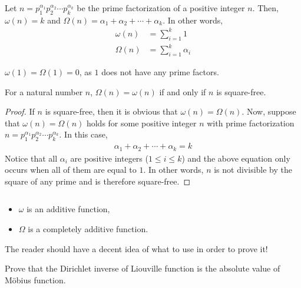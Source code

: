	\begin{proposition}
		Let $n= p_1^{\alpha_1} p_2^{\alpha_2} \cdots p_k^{\alpha_k}$ be the prime factorization of a positive integer $n$. Then, $\omega(n)=k$ and $\Omega(n)=\alpha_1 + \alpha_2 + \cdots + \alpha_k$. In other words,
			\begin{align*}
				\omega(n) & = \sum_{i=1}^{k} 1\\
				\Omega(n) & = \sum_{i=1}^{k} \alpha_i
			\end{align*}
	\end{proposition}

	\begin{note}
		$\omega(1) = \Omega(1)=0$, as $1$ does not have any prime factors.
	\end{note}

	\begin{proposition}
		For a natural number $n$, $\Omega(n)=\omega(n)$ if and only if $n$ is square-free.
	\end{proposition}

	\begin{proof}
		If $n$ is square-free, then it is obvious that $\omega(n)=\Omega(n)$. Now, suppose that $\omega(n)=\Omega(n)$ holds for some positive integer $n$ with prime factorization $n= p_1^{\alpha_1} p_2^{\alpha_2} \cdots p_k^{\alpha_k}$. In this case,
			\begin{align*}
				\alpha_1 + \alpha_2 + \cdots + \alpha_k = k
			\end{align*}
		Notice that all $\alpha_i$ are positive integers ($1 \leq i \leq k$) and the above equation only occurs when all of them are equal to $1$. In other words, $n$ is not divisible by the square of any prime and is therefore square-free.
	\end{proof}

	\begin{proposition}\label{prop:additiveomega}
		$ $
		\begin{itemize}
			\item $\omega$ is an additive function,
			\item $\Omega$ is a completely additive function.
		\end{itemize}
	\end{proposition}
The reader should have a decent idea of what to use in order to prove it!
	\begin{theorem}
		Prove that the Dirichlet inverse of Liouville function is the absolute value of M\"{o}bius function.
	\end{theorem}

